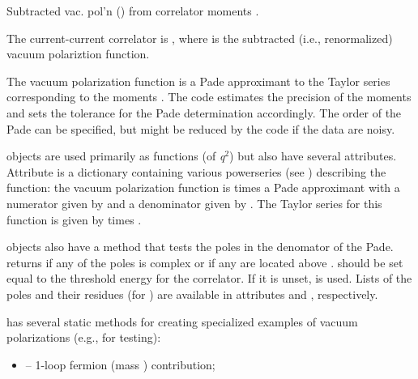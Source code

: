 \documentclass[letterpaper,10pt,english]{sphinxmanual}
\begin{document}
\begin{fulllineitems}
\label{g2tools:g2tools.vacpol}
Subtracted vac. pol'n () from correlator moments .

The current-current correlator is , where
 is the subtracted (i.e., renormalized)
vacuum polariztion function.

The vacuum polarization function is a Pade approximant to the Taylor
series corresponding to the moments .  The code estimates the
precision of the moments and sets the tolerance for the Pade determination
accordingly. The order  of the Pade can be specified, but might
be reduced by the code if the data are noisy.

{\hyperref[g2tools:g2tools.vacpol]{\emph{}}} objects are used primarily as functions (of \emph{q}$^{\text{2}}$)
but also have several attributes. Attribute  is a dictionary
containing various powerseries (see ) describing the
function: the vacuum polarization function is  times a Pade
approximant  with a numerator given by  and a
denominator  given by . The Taylor series for this
function  is given by  times .

{\hyperref[g2tools:g2tools.vacpol]{\emph{}}} objects also have a method {\hyperref[g2tools:g2tools.vacpol.badpoles]{\emph{}}} that
tests the poles in the denomator of the Pade.  returns
 if any of the poles is complex or if any are located above
.  should be set equal to the threshold energy for
the correlator. If it is unset,  is used. Lists of the
poles and their residues (for ) are available in
attributes  and , respectively.

{\hyperref[g2tools:g2tools.vacpol]{\emph{}}} has several static methods for creating specialized
examples of vacuum polarizations (e.g., for testing):
\begin{itemize}
\item {} 
 -- 1-loop fermion (mass ) contribution;


\end{itemize}
\end{fulllineitems}
\end{document}
